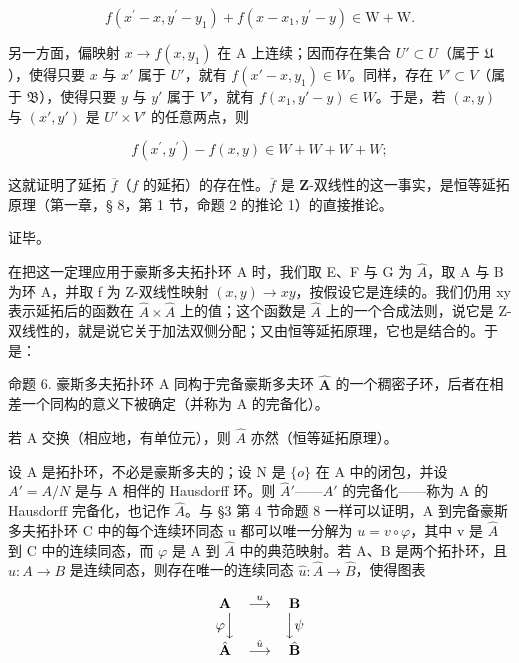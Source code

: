 \[
f \left(x ^ {\prime} - x, y ^ {\prime} - y _ {1}\right) + f \left(x - x _ {1}, y ^ {\prime} - y\right) \in \mathrm{W} + \mathrm{W}.
\]

另一方面，偏映射 \(x \to f(x, y_1)\) 在 A 上连续；因而存在集合 \(U' \subset U\)（属于 \(\mathfrak{U}\)），使得只要 \(x\) 与 \(x'\) 属于 \(U'\)，就有 \(f(x' - x, y_1) \in W\)。同样，存在 \(V' \subset V\)（属于 \(\mathfrak{B}\)），使得只要 \(y\) 与 \(y'\) 属于 \(V'\)，就有 \(f(x_1, y' - y) \in W\)。于是，若 \((x, y)\) 与 \((x', y')\) 是 \(U' \times V'\) 的任意两点，则

\[
f \left(x ^ {\prime}, y ^ {\prime}\right) - f (x, y) \in W + W + W + W;
\]

这就证明了延拓 \(\overline{f}\)（\(f\) 的延拓）的存在性。\(\overline{f}\) 是 \(\mathbf{Z}\)-双线性的这一事实，是恒等延拓原理（第一章，§ 8，第 1 节，命题 2 的推论 1）的直接推论。

证毕。

在把这一定理应用于豪斯多夫拓扑环 A 时，我们取 E、F 与 G 为 \(\hat{A}\)，取 A 与 B 为环 A，并取 f 为 Z-双线性映射 \((x, y) \to xy\)，按假设它是连续的。我们仍用 xy 表示延拓后的函数在 \(\hat{A} \times \hat{A}\) 上的值；这个函数是 \(\hat{A}\) 上的一个合成法则，说它是 Z-双线性的，就是说它关于加法双侧分配；又由恒等延拓原理，它也是结合的。于是：

命题 6. 豪斯多夫拓扑环 A 同构于完备豪斯多夫环 \(\hat{\mathbf{A}}\) 的一个稠密子环，后者在相差一个同构的意义下被确定（并称为 A 的完备化）。

若 A 交换（相应地，有单位元），则 \(\hat{A}\) 亦然（恒等延拓原理）。

设 A 是拓扑环，不必是豪斯多夫的；设 N 是 \(\{o\}\) 在 A 中的闭包，并设 \(A' = A/N\) 是与 A 相伴的 Hausdorff 环。则 \(\hat{A}'\)——\(A'\) 的完备化——称为 A 的 Hausdorff 完备化，也记作 \(\hat{A}\)。与 §3 第 4 节命题 8 一样可以证明，A 到完备豪斯多夫拓扑环 C 中的每个连续环同态 u 都可以唯一分解为 \(u = v \circ \varphi\)，其中 v 是 \(\hat{A}\) 到 C 中的连续同态，而 \(\varphi\) 是 A 到 \(\hat{A}\) 中的典范映射。若 A、B 是两个拓扑环，且 \(u : A \to B\) 是连续同态，则存在唯一的连续同态 \(\hat{u} : \hat{A} \to \hat{B}\)，使得图表

\[
\begin{array}{c c c} \mathbf {A} & \stackrel {{u}} {{\longrightarrow}} & \mathbf {B} \\ \varphi \Big \downarrow & & \Big \downarrow \psi \\ \hat {\mathbf {A}} & \stackrel {{\hat {u}}} {{\longrightarrow}} & \hat {\mathbf {B}} \end{array}
\]

